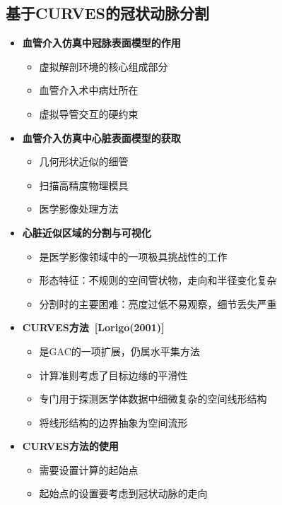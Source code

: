 \subsection[冠状动脉分割I]{基于CURVES的冠状动脉分割}

\begin{frame}
\begin{itemize}
\item \textbf{血管介入仿真中冠脉表面模型的作用}
\begin{itemize}
\item 虚拟解剖环境的核心组成部分
\item 血管介入术中病灶所在
\item 虚拟导管交互的硬约束
\end{itemize}
\pause \item \textbf{血管介入仿真中心脏表面模型的获取}
\begin{itemize}
\item 几何形状近似的细管
\item 扫描高精度物理模具
\item 医学影像处理方法
\end{itemize}
\pause \item \textbf{心脏近似区域的分割与可视化}
\begin{itemize}
\item 是医学影像领域中的一项极具挑战性的工作
\item 形态特征：不规则的空间管状物，走向和半径变化复杂
\item 分割时的主要困难：亮度过低不易观察，细节丢失严重
\end{itemize}
\end{itemize}
\end{frame}

\begin{frame}
\begin{itemize}
\item \textbf{CURVES方法~[Lorigo(2001)]}
\begin{itemize}
\item 是GAC的一项扩展，仍属水平集方法
\item 计算准则考虑了目标边缘的平滑性
\item 专门用于探测医学体数据中细微复杂的空间线形结构
\item 将线形结构的边界抽象为空间流形
\end{itemize}
\pause \item \textbf{CURVES方法的使用}
\begin{itemize}
\item 需要设置计算的起始点
\item 起始点的设置要考虑到冠状动脉的走向
\end{itemize}
\end{itemize}
\end{frame}

